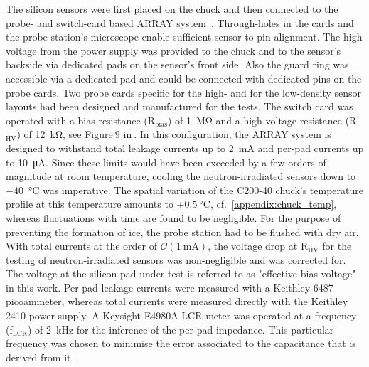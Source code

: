 The silicon sensors were first placed on the chuck and then connected to the probe- and switch-card based ARRAY system~\cite{pitters:array2019}.
Through-holes in the cards and the probe station's microscope  enable sufficient sensor-to-pin alignment. 
The high voltage from the power supply was provided to the chuck and to the sensor's backside via dedicated pads on the sensor's front side.
Also the guard ring was accessible via a dedicated pad and could be connected with dedicated pins on the probe cards.
Two probe cards specific for the high- and for the low-density sensor layouts had been designed and manufactured for the tests.
The switch card was operated with a bias resistance (R$_\text{bias}$) of \SI{1}{\mega\ohm} and a high voltage resistance (R$_\text{HV}$) of \SI{12}{\kilo\ohm}, see Figure$~$9 in$~$\cite{pitters:array2019}.
In this configuration, the ARRAY system is designed to withstand total leakage currents up to \SI{2}{\milli\ampere} and per-pad currents up to \SI{10}{\micro\ampere}.
Since these limits would have been exceeded by a few orders of magnitude at room temperature, cooling the neutron-irradiated sensors down to \SI{-40}{\celsius} was imperative.
The spatial variation of the C200-40 chuck's temperature profile at this temperature amounts to $\pm\SI{0.5}{\celsius}$, cf.~\ref{appendix:chuck_temp}, whereas fluctuations with time are found to be negligible. 
For the purpose of preventing the formation of ice, the probe station had to be flushed with dry air. 
With total currents at the order of $\mathcal{O}(\SI{1}{\milli\ampere})$, the voltage drop at R$_\text{HV}$ for the testing of neutron-irradiated sensors was non-negligible and was corrected for.
The voltage at the silicon pad under test is referred to as "effective bias voltage" in this work.
Per-pad leakage currents were measured with a Keithley 6487 picoammeter, whereas total currents were measured directly with the Keithley 2410 power supply.
A Keysight E4980A LCR meter was operated at a frequency (f$_\text{LCR}$) of \SI{2}{\kilo\hertz} for the inference of the per-pad impedance.
This particular frequency was chosen to minimise the error associated to the capacitance that is derived from it~\cite{pitters:array2019}.

